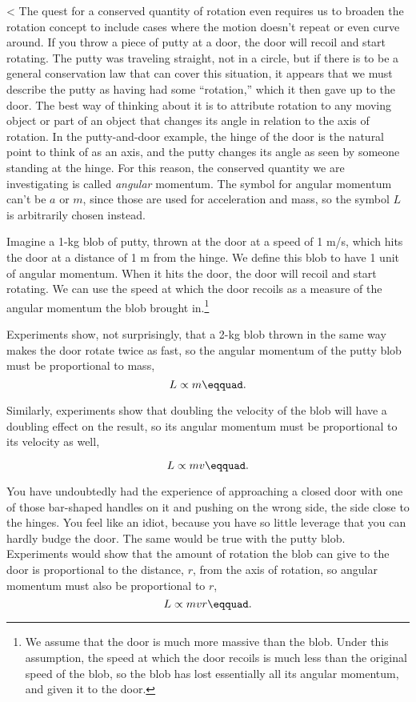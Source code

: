 <%
The quest for a conserved quantity of rotation even requires
us to broaden the rotation concept to include cases where
the motion doesn't repeat or even curve around. If you throw
a piece of putty at a door, the door will recoil and start
rotating. The putty was traveling straight, not in a circle,
but if there is to be a general conservation law that can
cover this situation, it appears that we must describe the
putty as having had some ``rotation,'' which it then gave up
to the door. The best way of thinking about it is to
attribute rotation to any moving object or part of an object
that changes its angle in relation to the axis of rotation.
In the putty-and-door example, the hinge of the door is the
natural point to think of as an axis, and the putty changes
its angle as seen by someone standing at the hinge. For this
reason, the conserved quantity we are investigating is
called \emph{angular\/} momentum.
The symbol for angular momentum can't be $a$ or $m$,
since those are used for acceleration and mass, so the
symbol $L$ is arbitrarily chosen instead.

Imagine a 1-kg blob of putty, thrown at the door at a speed
of 1 m/s, which hits the door at a distance of 1 m from
the hinge. We define this blob to have 1 unit of angular
momentum. When it hits the door, the door
will recoil and start rotating.
 We can use the speed at which the door recoils as a measure
of the angular momentum the blob brought in.\footnote{We assume that the door is much
 more massive than the blob. Under this assumption, the speed at which the
 door recoils is much less than the original speed of the blob, so the blob
 has lost essentially all its angular momentum, and given it to the door.}

Experiments show, not surprisingly, that a 2-kg blob thrown
in the same way makes the door rotate twice as fast, so the
angular momentum of the putty blob must be proportional to mass,
\begin{equation*}
 L\propto m\eqquad.
\end{equation*}

Similarly, experiments show that doubling the velocity of
the blob will have a doubling effect on the result, so its
angular momentum must be proportional to its velocity as well,

\begin{equation*}
 L\propto mv\eqquad.
\end{equation*}

You have undoubtedly had the experience of approaching a
closed door with one of those bar-shaped handles on it and
pushing on the wrong side, the side close to the hinges. You
feel like an idiot, because you have so little leverage that
you can hardly budge the door. The same would be true with
the putty blob. Experiments would show that the amount of
rotation the blob can give to the door is proportional to
the distance, $r$, from the axis of rotation, so angular
momentum must also be proportional to $r$,
\begin{equation*}
 L\propto mvr\eqquad.
\end{equation*}

